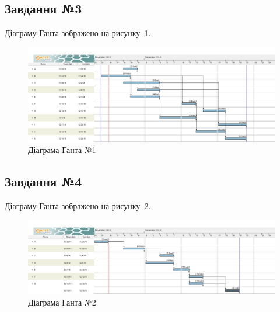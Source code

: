 \subsection*{Завдання №3}
Діаграму Ганта зображено на рисунку~\ref{fig:1_gantt}.

\begin{figure}[h]
    \centering
        \includegraphics[width=\textwidth]{1_gantt}
    \caption{Діаграма Ганта №1}
    \label{fig:1_gantt}
\end{figure}

\subsection*{Завдання №4}
Діаграму Ганта зображено на рисунку~\ref{fig:2_gantt}.

\begin{figure}[h]
    \centering
        \includegraphics[width=\textwidth]{2_gantt}
    \caption{Діаграма Ганта №2}
    \label{fig:2_gantt}
\end{figure}



